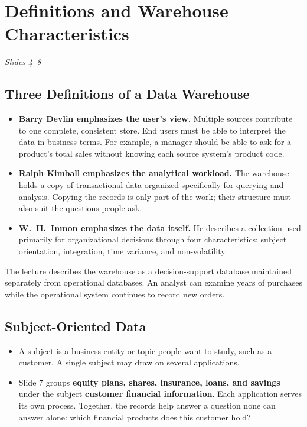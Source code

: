 \documentclass[12pt,a4paper]{article}
\newcommand{\slides}[1]{\textit{\small #1}\par}
\begin{document}
\newpage
\section{Definitions and Warehouse Characteristics}
\slides{Slides 4--8}
\subsection{Three Definitions of a Data Warehouse}
\begin{itemize}
\item \textbf{Barry Devlin emphasizes the user's view.} Multiple sources contribute to one complete, consistent store. End users must be able to interpret the data in business terms. For example, a manager should be able to ask for a product's total sales without knowing each source system's product code.
\item \textbf{Ralph Kimball emphasizes the analytical workload.} The warehouse holds a copy of transactional data organized specifically for querying and analysis. Copying the records is only part of the work; their structure must also suit the questions people ask.
\item \textbf{W.\ H.\ Inmon emphasizes the data itself.} He describes a collection used primarily for organizational decisions through four characteristics: subject orientation, integration, time variance, and non-volatility.
\end{itemize}
The lecture describes the warehouse as a decision-support database maintained separately from operational databases. An analyst can examine years of purchases while the operational system continues to record new orders.

\subsection{Subject-Oriented Data}
\begin{itemize}
\item A subject is a business entity or topic people want to study, such as a customer. A single subject may draw on several applications.
\item Slide 7 groups \textbf{equity plans, shares, insurance, loans, and savings} under the subject \textbf{customer financial information}. Each application serves its own process. Together, the records help answer a question none can answer alone: which financial products does this customer hold?
\end{itemize}
\end{document}
